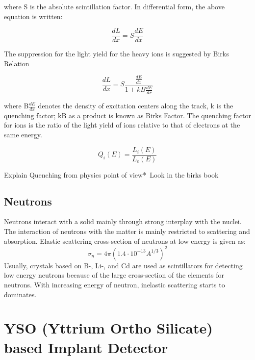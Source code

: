 \documentclass[a4paper,12pt,twoside]{report}
\begin{document}
where S is the absolute scintillation factor. In differential form, the above equation is written:

\begin{equation}
    \frac{dL}{dx}= S\frac{dE}{dx}
\end{equation}

The suppression for the light yield for the heavy ions is suggested by Birks Relation

\begin{equation}
\frac{dL}{dx}= S\frac{\frac{dE}{dx}}{1+kB\frac{dE}{dr}}
\end{equation}

where B$\frac{dE}{dx}$ denotes the density of excitation centers along the track, k is the quenching factor; kB as a product is known as Birks Factor. The quenching factor for ions is the ratio of the light yield of ions relative to that of electrons at the same energy.

\begin{equation}
Q_{i}(E)=\frac{L_{i}(E)}{L_{e}(E)}
\end{equation}


\*Explain Quenching from physics point of view*\ Look in the birks book 


\subsection{Neutrons}
Neutrons interact with a solid mainly through strong interplay with the nuclei. The interaction of neutrons with the matter is mainly restricted to scattering and absorption. Elastic scattering cross-section of neutrons at low energy is given as:
\begin{equation}
    \sigma_{n}=4\pi(1.4 \cdot 10^{-13} A^{1/3})^{2}
\end{equation}
Usually, crystals based on B-, Li-, and Cd are used as scintillators for detecting low energy neutrons because of the large cross-section of the elements for neutrons. With increasing energy of neutron, inelastic scattering starts to dominates.

\section{YSO (Yttrium Ortho Silicate) based Implant Detector}
\end{document}
